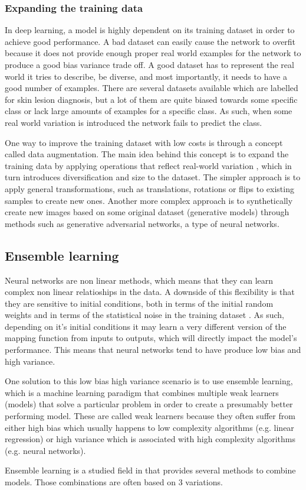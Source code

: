 \subsubsection{Expanding the training data}
In deep learning, a model is highly dependent on its training dataset in order to achieve good performance.
A bad dataset can easily cause the network to overfit because it does not provide enough proper real world examples for the network to produce a good bias variance trade off. A good dataset has to represent the real world it tries to describe, be diverse, and most importantly, it needs to have a good number of examples.
There are several datasets available which are labelled for skin lesion diagnosis, but a lot of them are quite biased towards some specific class or lack large amounts of examples for a specific class. As such, when some real world variation is introduced the network fails to predict the class. \par
One way to improve the training dataset with low costs is through a concept called data augmentation. The main idea behind this concept is to expand the training data by applying operations that reflect real-world variation \cite{Nielsen2017a}, which in turn introduces diversification and size to the dataset. The simpler approach is to apply general transformations, such as translations, rotations or flips to existing samples to create new ones. Another more complex approach is to synthetically create new images based on some original dataset (generative models) through methods such as generative adversarial networks, a type of neural networks.

\subsection{Ensemble learning}
Neural networks are non linear methods, which means that they can learn complex non linear relatioships in the data. A downside of this flexibility is that they are sensitive to initial conditions, both in terms of the initial random weights and in terms of the statistical noise in the training dataset \cite{Brownlee}. As such, depending on it's initial conditions it may learn a very different version of the mapping function from inputs to outputs, which will directly impact the model's performance. This means that neural networks tend to have produce low bias and high variance. \par
One solution to this low bias high variance scenario is to use ensemble learning, which is a machine learning paradigm that combines multiple weak learners (models) that solve a particular problem in order to create a presumably better performing model. These are called weak learners because they often suffer from either high bias which usually happens to low complexity algorithms (e.g. linear regression) or high variance which is associated with high complexity algorithms (e.g. neural networks). \par
Ensemble learning is a studied field in that provides several methods to combine models. Those combinations are often based on 3 variations.
